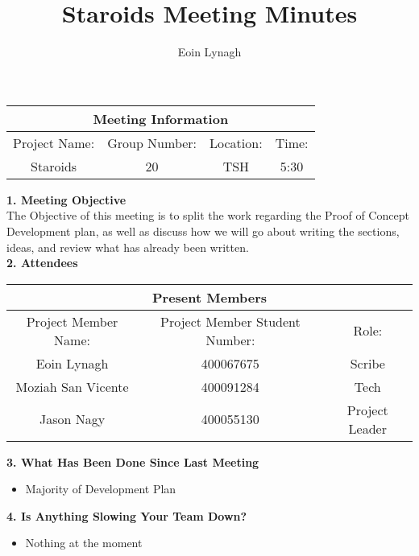 \documentclass[12pt]{article}
\title{Staroids Meeting Minutes}
\author{Eoin Lynagh}
\begin{document}
\maketitle
\begin{center}
 \begin{tabular}{|c | c | c |  c |} 
 \hline
 \multicolumn{4}{|c|}{Meeting Information} \\
\hline
 Project Name: & Group Number: & Location: & Time: \\ 
 \hline
 Staroids & 20 & TSH & 5:30 \\
\hline
\end{tabular}
\end{center}
\begin{flushleft}


\textbf{1. Meeting Objective}\\
The Objective of this meeting is to split the work regarding the Proof of Concept Development plan, as well as discuss how we will go about writing the sections, ideas, and review what has already been written.\\

\textbf{2. Attendees}\\
\begin{center}
 \begin{tabular}{|c | c | c | } 
 \hline
 \multicolumn{3}{|c|}{Present Members} \\
\hline
 Project Member Name: & Project Member Student Number: & Role: \\ 
 \hline\hline
 Eoin Lynagh & 400067675 & Scribe \\
\hline
Moziah San Vicente & 400091284 & Tech \\
\hline
 Jason Nagy & 400055130 & Project Leader \\
\hline
\end{tabular}
\end{center}

\textbf{3. What Has Been Done Since Last Meeting}\\
\begin{itemize}
\item Majority of Development Plan
\end{itemize}

\textbf{4. Is Anything Slowing Your Team Down?}\\
\begin{itemize}
\item Nothing at the moment
\end{itemize}


\end{flushleft}
\end{document}
